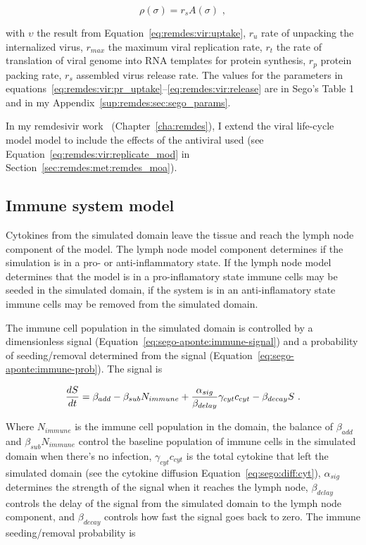 \begin{equation}\label{eq:remdes:vir:release}
    \rho(\sigma) = r_s A(\sigma)\,\,,
\end{equation}

\noindent
with $\upsilon$ the result from Equation~\ref{eq:remdes:vir:uptake}, $r_u$ rate of unpacking the internalized virus, $r_{max}$ the maximum viral replication rate, $r_t$ the rate of translation of viral genome into RNA templates for protein synthesis, $r_p$ protein packing rate, $r_s$ assembled virus release rate. The values for the parameters in equations~\ref{eq:remdes:vir:pr_uptake}--\ref{eq:remdes:vir:release} are in Sego's Table 1~\cite{sego_modular_2020} and in my Appendix~\ref{sup:remdes:sec:sego_params}. 

In my remdesivir work~\cite{ferrari_gianlupi_multiscale_2022} (Chapter~\ref{cha:remdes}), I extend the viral life-cycle model model to include the effects of the antiviral used (see Equation~\ref{eq:remdes:vir:replicate_mod} in Section~\ref{sec:remdes:met:remdes_moa}).

\subsection{Immune system model}\label{sec:sego-aponte:immune}

Cytokines from the simulated domain leave the tissue and reach the lymph node component of the model. The lymph node model component determines if the simulation is in a pro- or anti-inflammatory state. If the lymph node model determines that the model is in a pro-inflamatory state immune cells may be seeded in the simulated domain, if the system is in an anti-inflamatory state immune cells may be removed from the simulated domain. 

The immune cell population in the simulated domain is controlled by a dimensionless signal (Equation~\ref{eq:sego-aponte:immune-signal}) and a probability of seeding/removal determined from the signal (Equation~\ref{eq:sego-aponte:immune-prob}). The signal is

\begin{equation}\label{eq:sego-aponte:immune-signal}
    \frac{dS}{dt} = \beta_{add} - \beta_{sub} N_{immune} + \frac{\alpha_{sig}}{\beta_{delay}}\gamma_{cyt} c_{cyt} - \beta_{decay} S\,\,.
\end{equation}

\noindent Where $N_{immune}$ is the immune cell population in the domain, the balance of $\beta_{add}$ and $\beta_{sub} N_{immune}$ control the baseline population of immune cells in the simulated domain when there's no infection, $\gamma_{cyt} c_{cyt}$ is the total cytokine that left the simulated domain (see the cytokine diffusion Equation~\ref{eq:sego:diff:cyt}), $\alpha_{sig}$ determines the strength of the signal when it reaches the lymph node, $\beta_{delay}$ controls the delay of the signal from the simulated domain to the lymph node component, and $\beta_{decay}$ controls how fast the signal goes back to zero. The immune seeding/removal probability is

